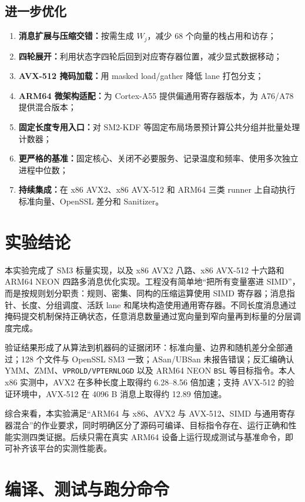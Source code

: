 \documentclass[UTF8,a4paper,12pt]{ctexart}
\newcommand{\code}[1]{\texttt{#1}}
\begin{document}
\subsection{进一步优化}
\begin{enumerate}
  \item \textbf{消息扩展与压缩交错：}按需生成 $W_j$，减少 68 个向量的栈占用和访存；
  \item \textbf{四轮展开：}利用状态字四轮后回到对应寄存器位置，减少显式数据移动；
  \item \textbf{AVX-512 掩码加载：}用 masked load/gather 降低 lane 打包分支；
  \item \textbf{ARM64 微架构适配：}为 Cortex-A55 提供偏通用寄存器版本，为 A76/A78 提供混合版本；
  \item \textbf{固定长度专用入口：}对 SM2-KDF 等固定布局场景预计算公共分组并批量处理计数器；
  \item \textbf{更严格的基准：}固定核心、关闭不必要服务、记录温度和频率、使用多次独立进程中位数；
  \item \textbf{持续集成：}在 x86 AVX2、x86 AVX-512 和 ARM64 三类 runner 上自动执行标准向量、OpenSSL 差分和 Sanitizer。
\end{enumerate}

\section{实验结论}
本实验完成了 SM3 标量实现，以及 x86 AVX2 八路、x86 AVX-512 十六路和 ARM64 NEON 四路多消息优化实现。工程没有简单地“把所有变量塞进 SIMD”，而是按规则划分职责：规则、密集、同构的压缩运算使用 SIMD 寄存器；消息指针、长度、分组调度、活跃 lane 和尾块构造使用通用寄存器。不同长度消息通过掩码提交机制保持正确状态，任意消息数量通过宽向量到窄向量再到标量的分层调度完成。

验证结果形成了从算法到机器码的证据闭环：标准向量、边界和随机差分全部通过；128 个文件与 OpenSSL SM3 一致；ASan/UBSan 未报告错误；反汇编确认 YMM、ZMM、\code{VPROLD/VPTERNLOGD} 以及 ARM64 NEON \code{BSL} 等目标指令。本人 x86 实测中，AVX2 在多种长度上取得约 6.28--8.56 倍加速；支持 AVX-512 的验证环境中，AVX-512 在 4096 B 消息上取得约 12.89 倍加速。

综合来看，本实验满足“ARM64 与 x86、AVX2 与 AVX-512、SIMD 与通用寄存器混合”的作业要求，同时明确区分了源码可编译、目标指令存在、运行正确和性能实测四类证据。后续只需在真实 ARM64 设备上运行现成测试与基准命令，即可补齐该平台的实测性能表。

\clearpage
\appendix
\section{编译、测试与跑分命令}
\end{document}
